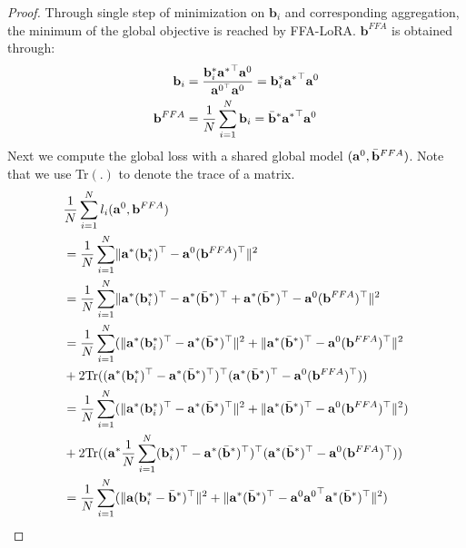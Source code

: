 \documentclass{article}
\theoremstyle{plain}
\theoremstyle{definition}
\theoremstyle{remark}
\begin{document}
\begin{proof}
    Through single step of minimization on $\mathbf{b}_i$ and corresponding aggregation, the minimum of the global objective is reached by FFA-LoRA. ${\mathbf{b}}^{FFA}$ is obtained through:
    \begin{align}
        \mathbf{b}_i &= \frac{\mathbf{b}_i^* \mathbf{a^*}^\top \mathbf{a}^0}{\mathbf{a}^{0^\top}\mathbf{a}^0} = \mathbf{b}_i^* \mathbf{a^*}^\top \mathbf{a}^0 \\
        {\mathbf{b}}^{FFA} &= \frac{1}{N} \sum_{i=1}^{N} \mathbf{b}_i = \Bar{\mathbf{b}}^*\mathbf{a^*}^\top \mathbf{a}^0
    \end{align}
    Next we compute the global loss with a shared global model $(\mathbf{a}^0, \Bar{\mathbf{b}}^{FFA})$. Note that we use Tr$(.)$ to denote the trace of a matrix.
    \begin{align}
        &\frac{1}{N} \sum_{i=1}^{N} l_i(\mathbf{a}^0, {\mathbf{b}}^{FFA}) \\&= \frac{1}{N} \sum_{i=1}^{N} \lVert \mathbf{a}^* (\mathbf{b}_i^*)^\top - \mathbf{a}^0 ({\mathbf{b}}^{FFA})^\top  \rVert^2 \\
        & = \frac{1}{N} \sum_{i=1}^{N} \lVert \mathbf{a}^* (\mathbf{b}_i^*)^\top -\mathbf{a}^*(\Bar{\mathbf{b}}^*)^\top+ \mathbf{a}^*(\Bar{\mathbf{b}}^* )^\top- \mathbf{a}^0 ({\mathbf{b}}^{FFA})^\top  \rVert^2  \\
        & = \frac{1}{N} \sum_{i=1}^{N} (\lVert \mathbf{a}^* (\mathbf{b}_i^* )^\top-\mathbf{a}^*(\Bar{\mathbf{b}}^*)^\top \rVert^2 + \lVert \mathbf{a}^*(\Bar{\mathbf{b}}^*)^\top - \mathbf{a}^0 ({\mathbf{b}}^{FFA} )^\top \rVert^2 \nonumber \\
        &+ 2\text{Tr}((\mathbf{a}^* (\mathbf{b}_i^*)^\top -\mathbf{a}^*(\Bar{\mathbf{b}}^*)^\top)^\top(\mathbf{a}^*(\Bar{\mathbf{b}}^*)^\top - \mathbf{a}^0( {\mathbf{b}}^{FFA})^\top )) \\
        & = \frac{1}{N} \sum_{i=1}^{N} (\lVert \mathbf{a}^* (\mathbf{b}_i^*)^\top -\mathbf{a}^*(\Bar{\mathbf{b}}^*)^\top \rVert^2 + \lVert \mathbf{a}^*(\Bar{\mathbf{b}}^*)^\top - \mathbf{a}^0 ( {\mathbf{b}}^{FFA})^\top \rVert^2) \nonumber\\
       & + 2\text{Tr}((\mathbf{a}^* \frac{1}{N} \sum_{i=1}^{N} (\mathbf{b}_i^*)^\top -\mathbf{a}^*(\Bar{\mathbf{b}}^*)^\top)^\top(\mathbf{a}^*(\Bar{\mathbf{b}}^*)^\top - \mathbf{a}^0( {\mathbf{b}}^{FFA})^\top ))  \\
        & = \frac{1}{N} \sum_{i=1}^{N} (\lVert  \mathbf{a}(\mathbf{b}_i^*-\Bar{\mathbf{b}}^*)^\top \rVert^2 + \lVert \mathbf{a}^*(\Bar{\mathbf{b}}^*)^\top -  \mathbf{a}^0 {\mathbf{a}^0}^\top \mathbf{a}^* (\Bar{\mathbf{b}}^*)^\top \rVert^2) \label{heter-loss-6}  \\

\end{align}
\end{proof}
\end{document}
